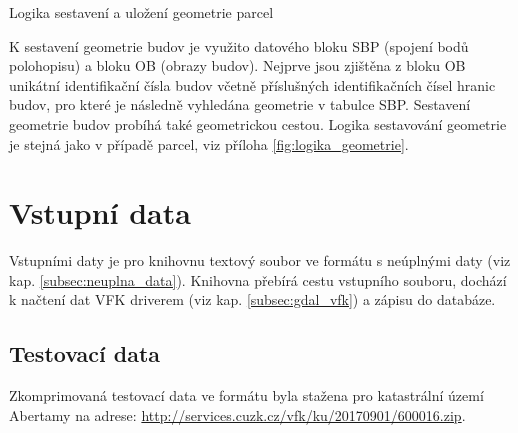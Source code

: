 \begin{algorithm}
\caption{Logika sestavení a uložení geometrie parcel}
\label{alg:sestaveni_parcely}
	\begin{algorithmic}[1]
		\ENDFOR
		\ELSE
		\ENDIF
	\ENDFOR
	\end{algorithmic}
\end{algorithm}

K sestavení geometrie budov je využito datového bloku SBP (spojení
bodů polohopisu) a bloku OB (obrazy budov). Nejprve jsou zjištěna z
bloku OB unikátní identifikační čísla budov včetně příslušných
identifikačních čísel hranic budov, pro které je následně vyhledána
geometrie v tabulce SBP. Sestavení geometrie budov probíhá také
geometrickou cestou. Logika sestavování geometrie je stejná jako v
případě parcel, viz příloha \ref{fig:logika_geometrie}.

\section{Vstupní data}
Vstupními daty je pro knihovnu textový soubor ve formátu  s
neúplnými daty (viz kap. \ref{subsec:neuplna_data}). Knihovna přebírá
cestu vstupního souboru, dochází k načtení dat VFK
driverem (viz kap. \ref{subsec:gdal_vfk}) a zápisu do databáze.

\subsection{Testovací data}
Zkomprimovaná testovací data ve formátu  byla stažena pro
katastrální území Abertamy na adrese:
\href{http://services.cuzk.cz/vfk/ku/20170901/600016.zip}{http://services.cuzk.cz/vfk/ku/20170901/600016.zip}.

